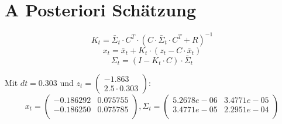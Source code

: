 \documentclass[12pt,a4paper]{article}
\begin{document}
\section{A Posteriori Schätzung}
\[
K_t = \bar{\Sigma}_t \cdot C^T \cdot (C \cdot \bar{\Sigma}_t \cdot C^T + R)^{-1}
\]
\[
x_t = \bar{x}_t + K_t \cdot (z_t - C \cdot \bar{x}_t)
\]
\[
\Sigma_t = (I - K_t \cdot C) \cdot \bar{\Sigma}_t
\]

Mit $dt = 0.303$ und $z_t = \begin{pmatrix}
-1.863 \\
2.5 \cdot 0.303
\end{pmatrix}$:
\[
x_t = \begin{pmatrix}
  -0.186292  & 0.075755\\
  -0.186250  & 0.075785\\
\end{pmatrix}, \Sigma_t = 
\begin{pmatrix}
   5.2678e-06  & 3.4771e-05\\
   3.4771e-05  & 2.2951e-04\\
\end{pmatrix}
\]
\end{document}
